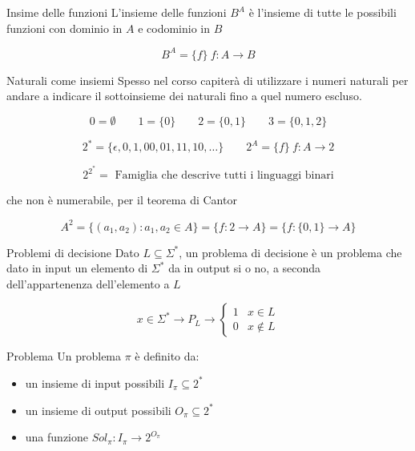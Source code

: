     \begin{paragrafo}{Insime delle funzioni}
        L'insieme delle funzioni $B^A$ è l'insieme di tutte le possibili funzioni con dominio in $A$ e codominio in $B$

        \[
            B^A = \{f\}\ f:A\rightarrow B
        \]

    \end{paragrafo}

    \begin{paragrafo}{Naturali come insiemi}
        Spesso nel corso capiterà di utilizzare i numeri naturali per andare a indicare il sottoinsieme dei naturali fino a quel numero escluso.
        
    \[
        0 = \emptyset \qquad 1 = \{0\} \qquad 2 = \{0,1\} \qquad 3 = \{0,1,2\}
    \]

    \[
        2^* = \{\epsilon,0,1,00,01,11,10,\dots \} \qquad 2^A= \{f\}\ f:A \rightarrow 2
    \]

    \[
        2^{2^*} = \text{ Famiglia che descrive tutti i linguaggi binari}
    \]
    \begin{center}che non è numerabile, per il teorema di Cantor\end{center}

    \[
        A^2=\{(a_1,a_2) : a_1, a_2 \in A\} = \{f:2 \rightarrow A\} = \{f:\{0,1\}\rightarrow A\}
    \]

    \end{paragrafo}


    \begin{paragrafo}{Problemi di decisione} 
        Dato $L \subseteq \Sigma^*$, un problema di decisione è un problema che dato in input un elemento di $\Sigma^*$ da in output si o no, a seconda dell'appartenenza dell'elemento a $L$

    \[
        x\in \Sigma^* \rightarrow \boxed{P_L} \rightarrow
        \begin{cases}
            1 & x \in L \\
            0 & x \notin L 
        \end{cases}
    \]

    \end{paragrafo}
    
    \begin{paragrafo}{Problema}
        Un problema $\pi$ è definito da:
            \begin{itemize}
                \item un insieme di input possibili $I_\pi \subseteq 2^*$
                \item un insieme di output possibili $O_\pi \subseteq 2^*$
                \item una funzione $Sol_\pi: I_\pi\rightarrow 2^{O_\pi}$
            \end{itemize}
    \end{paragrafo}

